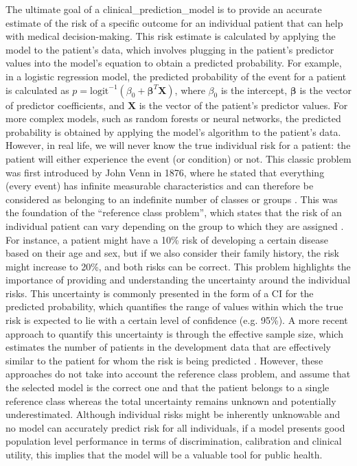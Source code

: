 The ultimate goal of a \gls{clinical_prediction_model} is to provide an accurate estimate of the risk of a specific outcome for an individual patient that can help with medical decision-making. This risk estimate is calculated by applying the model to the patient's data, which involves plugging in the patient's predictor values into the model's equation to obtain a predicted probability. For example, in a logistic regression model, the predicted probability of the event for a patient is calculated as $p = \text{logit}^{-1}(\beta_0 + \boldsymbol{\beta}^T \mathbf{X})$, where $\beta_0$ is the intercept, $\boldsymbol{\beta}$ is the vector of predictor coefficients, and $\mathbf{X}$ is the vector of the patient's predictor values. For more complex models, such as random forests or neural networks, the predicted probability is obtained by applying the model's algorithm to the patient's data. However, in real life, we will never know the true individual risk for a patient: the patient will either experience the event (or condition) or not. This classic problem was first introduced by John Venn in 1876, where he stated that everything (every event) has infinite measurable characteristics and can therefore be considered as belonging to an indefinite number of classes or groups \cite{Venn1876}. This was the foundation of the \enquote{reference class problem}, which states that the risk of an individual patient can vary depending on the group to which they are assigned \cite{Reichenbach1949,sternIndividualRisk2012}. For instance, a patient might have a 10\% risk of developing a certain disease based on their age and sex, but if we also consider their family history, the risk might increase to 20\%, and both risks can be correct. This problem highlights the importance of providing and understanding the uncertainty around the individual risks. This uncertainty is commonly presented in the form of a \gls{CI} for the predicted probability, which quantifies the range of values within which the true risk is expected to lie with a certain level of confidence (e.g. 95\%). A more recent approach to quantify this uncertainty is through the effective sample size, which estimates the number of patients in the development data that are effectively similar to the patient for whom the risk is being predicted \cite{thomassenEffectiveSampleSize2025}. However, these approaches do not take into account the reference class problem, and assume that the selected model is the correct one and that the patient belongs to a single reference class whereas the total uncertainty remains unknown and potentially underestimated. Although individual risks might be inherently unknowable and no model can accurately predict risk for all individuals, if a model presents good population level performance in terms of discrimination, calibration and clinical utility, this implies that the model will be a valuable tool for public health. 

